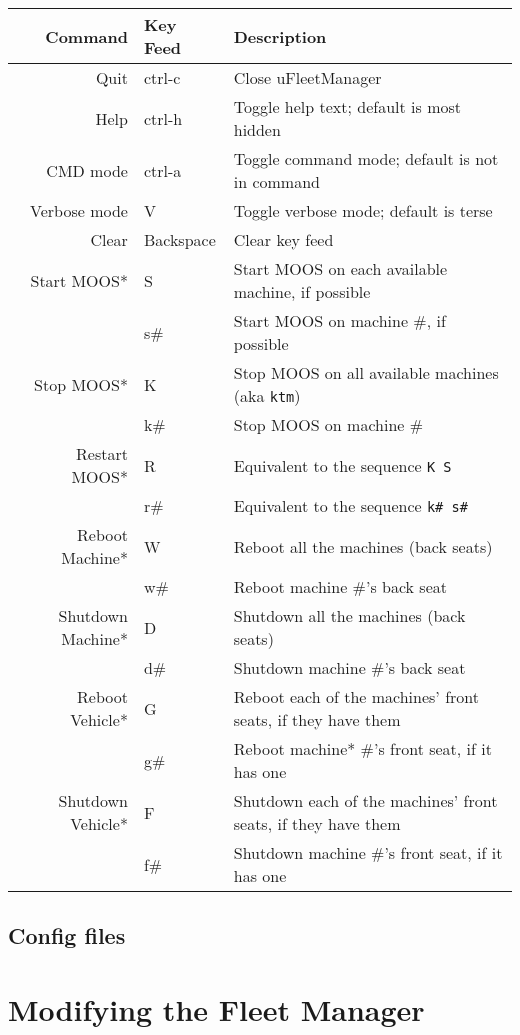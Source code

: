 \documentclass[11pt]{article}
\begin{document}
\begin{tabular}{r|ll}
Command & Key Feed & Description\\
\hline
Quit & ctrl-c & Close uFleetManager\\
Help & ctrl-h & Toggle help text; default is most hidden\\
CMD mode & ctrl-a & Toggle command mode; default is not in command\\
Verbose mode & V & Toggle verbose mode; default is terse\\
Clear & Backspace & Clear key feed\\ 
Start MOOS* & S & Start MOOS on each available machine, if possible\\
& s\# & Start MOOS on machine \#, if possible\\
Stop MOOS* & K & Stop MOOS on all available machines (aka \texttt{ktm})\\
& k\# & Stop MOOS on machine \#\\
Restart MOOS* & R & Equivalent to the sequence \texttt{K S}\\
& r\# & Equivalent to the sequence \texttt{k\# s\#}\\
Reboot Machine* & W & Reboot all the machines (back seats)\\
& w\# & Reboot machine \#'s back seat\\
Shutdown Machine* & D & Shutdown all the machines (back seats)\\
& d\# & Shutdown machine \#'s back seat\\
Reboot Vehicle* & G & Reboot each of the machines' front seats, if they have them\\
& g\# & Reboot machine* \#'s front seat, if it has one\\
Shutdown Vehicle* & F & Shutdown each of the machines' front seats, if they have them\\
& f\# & Shutdown machine \#'s front seat, if it has one
\end{tabular}
\subsection{Config files}
\section{Modifying the Fleet Manager}
\end{document}
